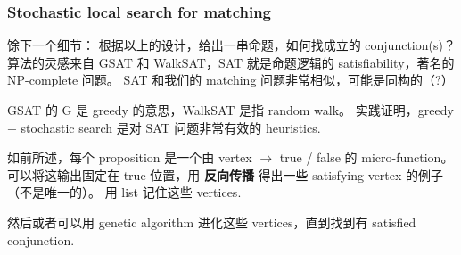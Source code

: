 \documentclass[orivec]{article}
\newcommand{\cc}[2]{#1}
\newcommand{\cc}[2]{#2}
\begin{document}
\subsubsection{Stochastic local search for matching}

\cc{
馀下一个细节： 根据以上的设计，给出一串命题，如何找成立的 conjunction(s)？  算法的灵感来自 GSAT 和 WalkSAT，SAT 就是命题逻辑的 satisfiability，著名的 NP-complete 问题。 SAT 和我们的 matching 问题非常相似，可能是同构的（?）}{
One remaining detail:  according to the above design, given a set of propositions, how do we find the satisfying conjunctions?  An inspiration comes from the GSAT and WalkSAT algorithms for propositional satisfiability, the famous NP-complete problem.  SAT is very similar to our problem, perhaps even isomorphic (?)
}

\cc{
GSAT 的 G 是 greedy 的意思，WalkSAT 是指 random walk。 实践证明，greedy + stochastic search 是对 SAT 问题非常有效的 heuristics.}{
The G in GSAT means greedy, whereas WalkSAT refers to random walk.  It has been proven in practice that greedy + stochastic search are highly effective heuristics for solving SAT.
}

\cc{
如前所述，每个 proposition 是一个由 vertex $\rightarrow$ true / false 的 micro-function。 可以将这输出固定在 true 位置，用 \textbf{反向传播} 得出一些 satisfying vertex 的例子（不是唯一的）。  用 list 记住这些 vertices.}{
As mentioned earlier, each proposition is a micro-function $f:$ vertex $\rightarrow$ true / false.  We can \textbf{clamp} the output value to true, and use \textbf{backward propagation} to obtain some instances of satisfying vertices (these are not unique).  Use a list to store these vertices.
}

\cc{
然后或者可以用 genetic algorithm 进化这些 vertices，直到找到有 satisfied conjunction.
}{
And then perhaps we can use a \textbf{genetic algorithm} to evolve these vertices until we find a satisfied conjunction.	
}

\end{document}

